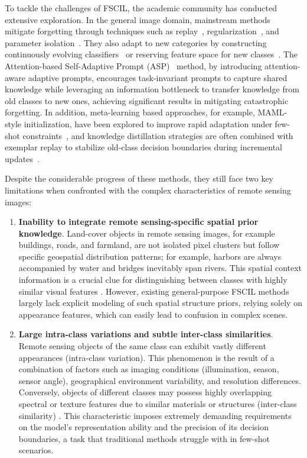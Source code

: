 ﻿\documentclass[letterpaper,journal]{IEEEtran}
\begin{document}
To tackle the challenges of FSCIL, the academic community has conducted extensive exploration. In the general image domain, mainstream methods mitigate forgetting through techniques such as replay~\cite{lopez2017, aljundi2019}, regularization~\cite{kirkpatrick2017, zenke2017}, and parameter isolation~\cite{rusu2016, xu2018}. They also adapt to new categories by constructing continuously evolving classifiers~\cite{zhang2021} or reserving feature space for new classes~\cite{zhou2022}. The Attention-based Self-Adaptive Prompt (ASP)~\cite{liu2024} method, by introducing attention-aware adaptive prompts, encourages task-invariant prompts to capture shared knowledge while leveraging an information bottleneck to transfer knowledge from old classes to new ones, achieving significant results in mitigating catastrophic forgetting. In addition, meta-learning based approaches, for example, MAML-style initialization, have been explored to improve rapid adaptation under few-shot constraints~\cite{finn2017, ravi2017, hospedales2021meta}, and knowledge distillation strategies are often combined with exemplar replay to stabilize old-class decision boundaries during incremental updates~\cite{rebuffi2017, li2017lwf, hinton2015distill, cheraghian2021skd}.

Despite the considerable progress of these methods, they still face two key limitations when confronted with the complex characteristics of remote sensing images:

\begin{enumerate}
    \item \textbf{Inability to integrate remote sensing-specific spatial prior knowledge}. Land-cover objects in remote sensing images, for example buildings, roads, and farmland, are not isolated pixel clusters but follow specific geospatial distribution patterns; for example, harbors are always accompanied by water and bridges inevitably span rivers. This spatial context information is a crucial clue for distinguishing between classes with highly similar visual features \cite{li2022, huang2022}. However, existing general-purpose FSCIL methods largely lack explicit modeling of such spatial structure priors, relying solely on appearance features, which can easily lead to confusion in complex scenes.
    \item \textbf{Large intra-class variations and subtle inter-class similarities}. Remote sensing objects of the same class can exhibit vastly different appearances (intra-class variation). This phenomenon is the result of a combination of factors such as imaging conditions (illumination, season, sensor angle), geographical environment variability, and resolution differences. Conversely, objects of different classes may possess highly overlapping spectral or texture features due to similar materials or structures (inter-class similarity) \cite{clemente2017, brusch2011}. This characteristic imposes extremely demanding requirements on the model's representation ability and the precision of its decision boundaries, a task that traditional methods struggle with in few-shot scenarios.
\end{enumerate}
\end{document}
